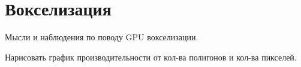 \chapter{Вокселизация}

Мысли и наблюдения по поводу GPU вокселизации.

Нарисовать график производительности от кол-ва полигонов и кол-ва пикселей.
